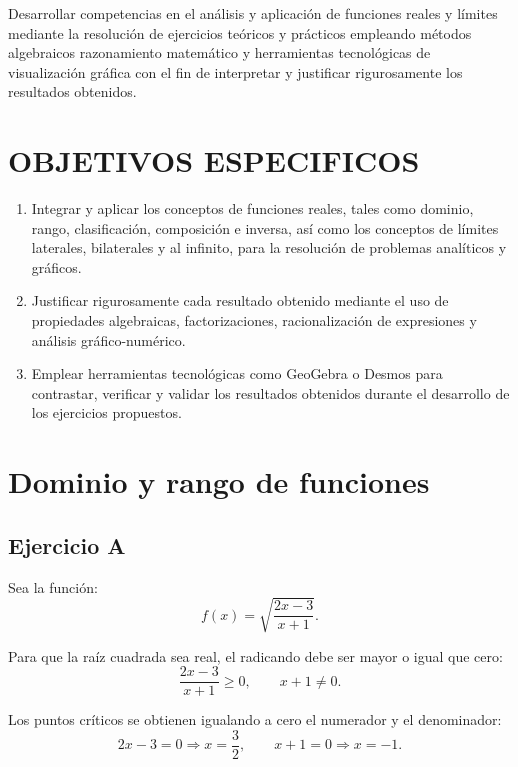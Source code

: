 \documentclass[12pt,a4paper]{article}
\begin{document}
	Desarrollar competencias en el análisis y aplicación de funciones reales y límites mediante la resolución de ejercicios teóricos y prácticos empleando métodos algebraicos razonamiento matemático y herramientas tecnológicas de visualización gráfica con el fin de interpretar y justificar rigurosamente los resultados obtenidos.
	
	\section{OBJETIVOS ESPECIFICOS}
	
	\begin{enumerate}
		
		\item Integrar y aplicar los conceptos de funciones reales, tales como dominio, rango, clasificación, composición e inversa, así como los conceptos de límites laterales, bilaterales y al infinito, para la resolución de problemas analíticos y gráficos.
		
		\item Justificar rigurosamente cada resultado obtenido mediante el uso de propiedades algebraicas, factorizaciones, racionalización de expresiones y análisis gráfico-numérico.
		
		\item Emplear herramientas tecnológicas como GeoGebra o Desmos para contrastar, verificar y validar los resultados obtenidos durante el desarrollo de los ejercicios propuestos.
		
	\end{enumerate}
	
	\section{Dominio y rango de funciones}
	
	\subsection{Ejercicio A}
	
	Sea la función:
	\[
	f(x)=\sqrt{\frac{2x-3}{x+1}}.
	\]
	
	Para que la raíz cuadrada sea real, el radicando debe ser mayor o igual que cero:
	\[
	\frac{2x-3}{x+1}\geq 0,
	\qquad x+1\neq 0.
	\]
	
	Los puntos críticos se obtienen igualando a cero el numerador y el denominador:
	\[
	2x-3=0 \Rightarrow x=\frac{3}{2},
	\qquad
	x+1=0 \Rightarrow x=-1.
	\]
	
\end{document}
